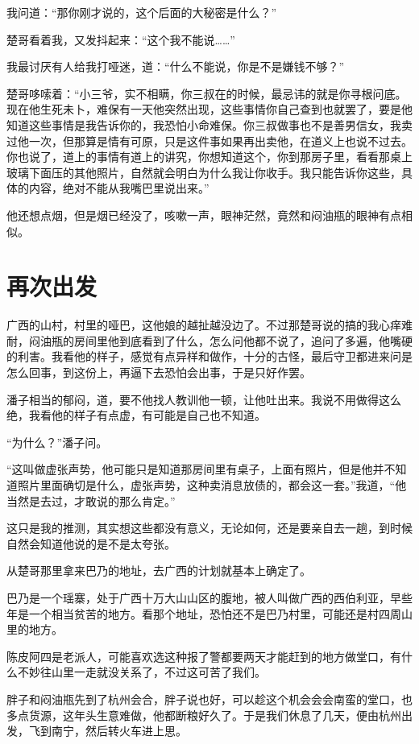 我问道：“那你刚才说的，这个后面的大秘密是什么？”

楚哥看着我，又发抖起来：“这个我不能说……”

我最讨厌有人给我打哑迷，道：“什么不能说，你是不是嫌钱不够？”

楚哥哆嗦着：“小三爷，实不相瞒，你三叔在的时候，最忌讳的就是你寻根问底。现在他生死未卜，难保有一天他突然出现，这些事情你自己查到也就罢了，要是他知道这些事情是我告诉你的，我恐怕小命难保。你三叔做事也不是善男信女，我卖过他一次，但那算是情有可原，只是这件事如果再出卖他，在道义上也说不过去。你也说了，道上的事情有道上的讲究，你想知道这个，你到那房子里，看看那桌上玻璃下面压的其他照片，自然就会明白为什么我让你收手。我只能告诉你这些，具体的内容，绝对不能从我嘴巴里说出来。”

他还想点烟，但是烟已经没了，咳嗽一声，眼神茫然，竟然和闷油瓶的眼神有点相似。

\chapter{再次出发}

广西的山村，村里的哑巴，这他娘的越扯越没边了。不过那楚哥说的搞的我心痒难耐，闷油瓶的房间里他到底看到了什么，怎么问他都不说了，追问了多遍，他嘴硬的利害。我看他的样子，感觉有点异样和做作，十分的古怪，最后守卫都进来问是怎么回事，到这份上，再逼下去恐怕会出事，于是只好作罢。

潘子相当的郁闷，道，要不他找人教训他一顿，让他吐出来。我说不用做得这么绝，我看他的样子有点虚，有可能是自己也不知道。

“为什么？”潘子问。

“这叫做虚张声势，他可能只是知道那房间里有桌子，上面有照片，但是他并不知道照片里面确切是什么，虚张声势，这种卖消息放债的，都会这一套。”我道，“他当然是去过，才敢说的那么肯定。”

这只是我的推测，其实想这些都没有意义，无论如何，还是要亲自去一趟，到时候自然会知道他说的是不是太夸张。

从楚哥那里拿来巴乃的地址，去广西的计划就基本上确定了。

巴乃是一个瑶寨，处于广西十万大山山区的腹地，被人叫做广西的西伯利亚，早些年是一个相当贫苦的地方。看那个地址，恐怕还不是巴乃村里，可能还是村四周山里的地方。

陈皮阿四是老派人，可能喜欢选这种报了警都要两天才能赶到的地方做堂口，有什么不妙往山里一走就没关系了，不过这可苦了我们。

胖子和闷油瓶先到了杭州会合，胖子说也好，可以趁这个机会会会南蛮的堂口，也多点货源，这年头生意难做，他都断粮好久了。于是我们休息了几天，便由杭州出发，飞到南宁，然后转火车进上思。

